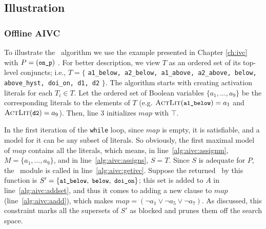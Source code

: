 \subsection{Illustration}
\subsubsection{Offline AIVC}
\label{sec:illust}
To illustrate the \aivcalg ~algorithm we use the example presented in Chapter \ref{ch:ivc} with $P = ({\small \texttt{on\_p}})$ .
For better description, we view $T$ as an ordered set of its top-level conjuncts; i.e., $T = \{$ {\small \texttt{a1\_below, a2\_below, a1\_above, a2\_above, below, above\_hyst, doi\_on, d1, d2}} $\}$.
The algorithm starts with creating activation literals for each $T_i \in T$. Let the ordered set of Boolean variables $\{ a_1, \ldots , a_9 \}$ be the corresponding literals to the elements of $T$ (e.g. $\textsc{ActLit} ({ \small \texttt{a1\_below}}) = a_1$ and $\textsc{ActLit} ({\small \texttt{d2}}) = a_9$). Then, line 3 initializes $map$ with $\top$.

In the first iteration of the \texttt{while} loop, since $map$ is
empty, it is satisfiable, and a model for it can be any subset of
literals. So obviously, the first maximal model of $map$ contains all
the literals, which means, in line~\ref{alg:aivc:assignm}, $M = \{a_1,
\ldots, a_9\}$, and in line~\ref{alg:aivc:assigns}, $S = T$. Since $S$
is adequate for $P$, the \getivc ~module is called in
line~\ref{alg:aivc:getivc}. Suppose the returned \mivc\ by this function
is $S' = \{ { \small \texttt{a1\_below},~\texttt{below},
  ~\texttt{doi\_on}}\}$; this set is added to $A$ in
line~\ref{alg:aivc:addset}, and thus it comes to adding a new clause
to $map$ (line~\ref{alg:aivc:aadd}), which makes $map = (\neg a_1 \vee
\neg a_5 \vee \neg a_7)$. As discussed, this constraint
marks all the supersets of $S'$ as blocked and prunes them off the
search space.

